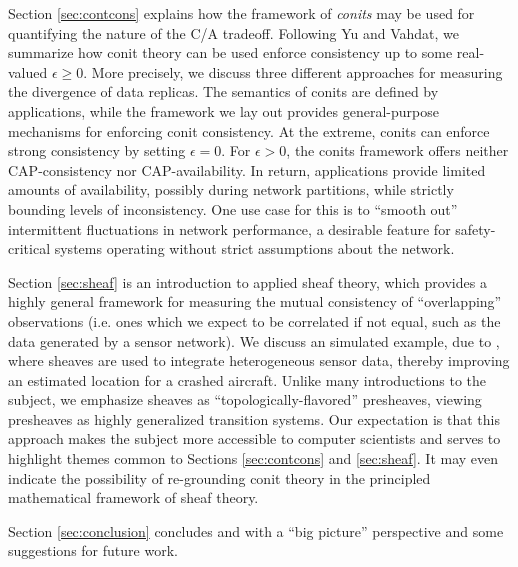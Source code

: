 Section \ref{sec:contcons} explains how the framework of \emph{conits}
\cite{2002tact} may be used for quantifying the nature of the C/A
tradeoff. Following Yu and Vahdat, we summarize how conit theory can
be used enforce consistency up to some real-valued $\epsilon \geq
0$. More precisely, we discuss three different approaches for
measuring the divergence of data replicas. The semantics of conits are
defined by applications, while the framework we lay out provides
general-purpose mechanisms for enforcing conit consistency. At the
extreme, conits can enforce strong consistency by setting $\epsilon =
0$. For $\epsilon > 0$, the conits framework offers neither
CAP-consistency nor CAP-availability. In return, applications provide
limited amounts of availability, possibly during network partitions,
while strictly bounding levels of inconsistency. One use case for this
is to ``smooth out'' intermittent fluctuations in network performance,
a desirable feature for safety-critical systems operating without
strict assumptions about the network.

Section \ref{sec:sheaf} is an introduction to applied sheaf theory,
which provides a highly general framework for measuring the mutual
consistency of ``overlapping'' observations (i.e. ones which we expect
to be correlated if not equal, such as the data generated by a sensor
network). We discuss an simulated example, due to \cite{}, where
sheaves are used to integrate heterogeneous sensor data, thereby
improving an estimated location for a crashed aircraft. Unlike many
introductions to the subject, we emphasize sheaves as
``topologically-flavored'' presheaves, viewing presheaves as highly
generalized transition systems. Our expectation is that this approach
makes the subject more accessible to computer scientists and serves to
highlight themes common to Sections \ref{sec:contcons} and
\ref{sec:sheaf}. It may even indicate the possibility of re-grounding
conit theory in the principled mathematical framework of sheaf theory.

Section \ref{sec:conclusion} concludes and with a ``big picture''
perspective and some suggestions for future work.

